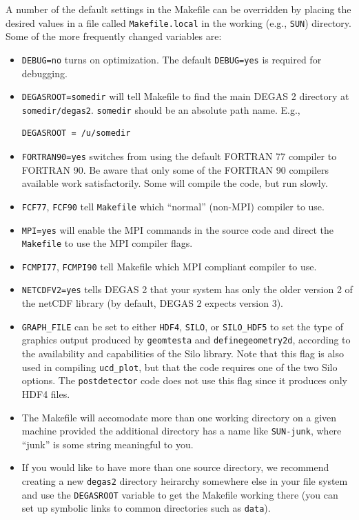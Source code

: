 \documentclass[12pt]{report}
\begin{document}
A number of the default settings in the Makefile can be overridden by
placing the desired values in a file called {\tt Makefile.local} in the
working (e.g., {\tt SUN}) directory. Some of the more frequently
changed variables are:
\begin{itemize}
  \item {\tt DEBUG=no} turns on optimization. The default {\tt DEBUG=yes}
is required for debugging.
  \item {\tt DEGASROOT=somedir} will tell Makefile to find the main
DEGAS 2 directory at {\tt somedir/degas2}. {\tt somedir} should be an
absolute path name. E.g.,
\begin{verbatim}
DEGASROOT = /u/somedir
\end{verbatim}
  \item {\tt FORTRAN90=yes} switches from using the default FORTRAN 77 
compiler to FORTRAN 90. Be aware that only some of the FORTRAN 90
compilers available work satisfactorily. Some will compile the code,
but run slowly.
  \item {\tt FCF77}, {\tt FCF90} tell {\tt Makefile} which ``normal'' (non-MPI)
compiler to use.
  \item {\tt MPI=yes} will enable the MPI commands in the source
code and direct the {\tt Makefile} to use the MPI compiler flags.
  \item {\tt FCMPI77}, {\tt FCMPI90} tell Makefile which MPI 
compliant compiler to use.
  \item {\tt NETCDFV2=yes} tells DEGAS 2 that your system has only the
older version 2 of the netCDF library (by default, DEGAS 2 expects version 3).
  \item {\tt GRAPH\_FILE} can be set to either {\tt HDF4},
{\tt SILO}, or {\tt SILO\_HDF5} to set the type of graphics
output produced by {\tt geomtesta} and {\tt definegeometry2d}, 
according to the availability and capabilities of the Silo library.
Note that this flag is also used in compiling {\tt ucd\_plot},
but that the code requires one of the two Silo options.  The
{\tt postdetector} code does not use this flag since it produces
only HDF4 files.
  \item The Makefile will accomodate more than one working directory on
a given machine provided the additional directory has a name like
{\tt SUN-junk}, where ``junk'' is some string meaningful to you.
  \item If you would like to have more than one source directory, we
recommend creating a new {\tt degas2} directory heirarchy somewhere else
in your file system and use the {\tt DEGASROOT} variable to get 
the Makefile working there (you can set up symbolic links to common
directories such as {\tt data}).
\end{itemize}
\end{document}
